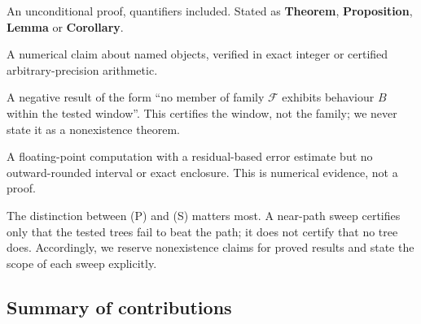 \begin{description}[leftmargin=2.4em,style=nextline,font=\normalfont\bfseries]
  \item[(P) Proved.] An unconditional proof, quantifiers included.
    Stated as \textbf{Theorem}, \textbf{Proposition}, \textbf{Lemma} or
    \textbf{Corollary}.
  \item[(E) Exact finite computation.] A numerical claim about named
    objects, verified in exact integer or certified
    arbitrary-precision arithmetic.
  \item[(S) Bounded sweep.] A negative result of the form ``no member
    of family $\mathcal{F}$ exhibits behaviour $B$ within the tested
    window''. This certifies the window, not the family; we never state it as a
    nonexistence theorem.
  \item[(N) High-precision numerics.] A floating-point computation with
    a residual-based error estimate but no outward-rounded interval or
    exact enclosure. This is numerical evidence, not a proof.
\end{description}

The distinction between (P) and (S) matters most. A near-path sweep
certifies only that the tested trees fail to beat the path; it does not
certify that no tree does. Accordingly, we reserve nonexistence claims
for proved results and state the scope of each sweep explicitly.

\subsection{Summary of contributions}

